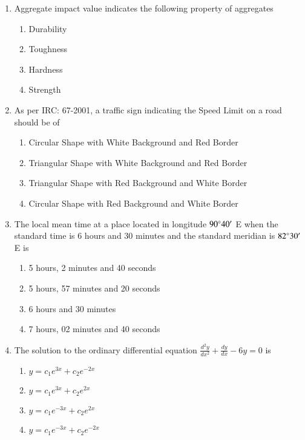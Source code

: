 \documentclass[journal]{IEEEtran}
\begin{document}
\begin{enumerate}
    \item Aggregate impact value indicates the following property of aggregates
        \begin{multicols}{4}
            \begin{enumerate}
                \item Durability
                \item Toughness
                \item Hardness
                \item Strength
            \end{enumerate}
        \end{multicols}

    \item As per IRC: 67-2001, a traffic sign indicating the Speed Limit on a road should be of
            \begin{enumerate}
                \item Circular Shape with White Background and Red Border
                \item Triangular Shape with White Background and Red Border
                \item Triangular Shape with Red Background and White Border
                \item Circular Shape with Red Background and White Border
            \end{enumerate}

    \item The local mean time at a place located in longitude $90\degree 40'$ E when the standard
    time is 6 hours and 30 minutes and the standard meridian is $82\degree 30'$ E is
        \begin{multicols}{2}
            \begin{enumerate}
                \item 5 hours, 2 minutes and 40 seconds
                \item 5 hours, 57 minutes and 20 seconds
                \item 6 hours and 30 minutes
                \item 7 hours, 02 minutes and 40 seconds
            \end{enumerate}
        \end{multicols}

    \item The solution to the ordinary differential equation
        $\frac{d^{2}y}{dx^{2}} + \frac{dy}{dx} - 6y = 0$ is
        \begin{multicols}{2}
            \begin{enumerate}
                \item $y=c_1e^{3x} + c_2e^{-2x}$
                \item $y=c_1e^{3x} + c_2e^{2x}$
                \item $y=c_1e^{-3x} + c_2e^{2x}$
                \item $y=c_1e^{-3x} + c_2e^{-2x}$
            \end{enumerate}
        \end{multicols}
\end{enumerate}
\end{document}

